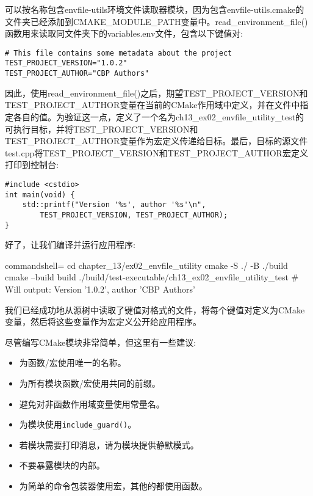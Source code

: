 可以按名称包含envfile-utils环境文件读取器模块，因为包含envfile-utils.cmake的文件夹已经添加到CMAKE\_MODULE\_PATH变量中。read\_environment\_file()函数用来读取同文件夹下的variables.env文件，包含以下键值对:

\begin{lstlisting}[style=styleCMake]
# This file contains some metadata about the project
TEST_PROJECT_VERSION="1.0.2"
TEST_PROJECT_AUTHOR="CBP Authors"
\end{lstlisting}

因此，使用read\_environment\_file()之后，期望TEST\_PROJECT\_VERSION和TEST\_PROJECT\_AUTHOR变量在当前的CMake作用域中定义，并在文件中指定各自的值。为验证这一点，定义了一个名为ch13\_ex02\_envfile\_utility\_test的可执行目标，并将TEST\_PROJECT\_VERSION和TEST\_PROJECT\_AUTHOR变量作为宏定义传递给目标。最后，目标的源文件test.cpp将TEST\_PROJECT\_VERSION和TEST\_PROJECT\_AUTHOR宏定义打印到控制台:

\begin{lstlisting}[style=styleCXX]
#include <cstdio>
int main(void) {
	std::printf("Version '%s', author '%s'\n",
		TEST_PROJECT_VERSION, TEST_PROJECT_AUTHOR);
}
\end{lstlisting}

好了，让我们编译并运行应用程序:

\begin{tcblisting}{commandshell={}}
cd chapter_13/ex02_envfile_utility
cmake -S ./ -B ./build
cmake --build build
./build/test-executable/ch13_ex02_envfile_utility_test
# Will output: Version '1.0.2', author 'CBP Authors'
\end{tcblisting}

我们已经成功地从源树中读取了键值对格式的文件，将每个键值对定义为CMake变量，然后将这些变量作为宏定义公开给应用程序。

尽管编写CMake模块非常简单，但这里有一些建议:

\begin{itemize}
\item 
为函数/宏使用唯一的名称。

\item 
为所有模块函数/宏使用共同的前缀。

\item 
避免对非函数作用域变量使用常量名。

\item 
为模块使用\texttt{include\_guard()}。

\item 
若模块需要打印消息，请为模块提供静默模式。

\item 
不要暴露模块的内部。

\item 
为简单的命令包装器使用宏，其他的都使用函数。
\end{itemize}

